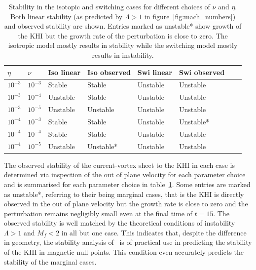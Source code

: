 \begin{table}[t]
\centering
\begin{tabular}{llllllll}
$\eta$    & $\nu$     & Iso linear & Iso observed & Swi linear & Swi observed  \\
\midrule
$10^{-3}$ & $10^{-3}$ & Stable     & Stable       & Unstable   & Unstable         & \\
$10^{-3}$ & $10^{-4}$ & Unstable   & Stable       & Unstable   & Unstable         & \\
$10^{-3}$ & $10^{-5}$ & Unstable   & Unstable     & Unstable   & Unstable         & \\
$10^{-4}$ & $10^{-3}$ & Stable     & Stable       & Unstable   & Unstable*         & \\
$10^{-4}$ & $10^{-4}$ & Stable     & Stable       & Unstable   & Unstable         & \\
$10^{-4}$ & $10^{-5}$ & Unstable   & Unstable*     & Unstable   & Unstable         &
\end{tabular}
\caption{Stability in the isotopic and switching cases for different choices of $\nu$ and $\eta$. Both linear stability (as predicted by $\Lambda > 1$ in figure~\ref{fig:mach_numbers}) and observed stability are shown. Entries marked as unstable* show growth of the KHI but the growth rate of the perturbation is close to zero. The isotropic model mostly results in stability while the switching model mostly results in instability.}
\label{tab:stability}
\end{table}

The observed stability of the current-vortex sheet to the KHI in each case is determined via inspection of the out of plane velocity for each parameter choice and is summarised for each parameter choice in table~\ref{tab:stability}. Some entries are marked as unstable*, referring to their being marginal cases, that is the KHI is directly observed in the out of plane velocity but the growth rate is close to zero and the perturbation remains negligibly small even at the final time of $t=15$. The observed stability is well matched by the theoretical conditions of instability $\Lambda > 1$ and $M_f < 2$ in all but one case. This indicates that, despite the difference in geometry, the stability analysis of~\cite{einaudiResistiveInstabilitiesFlowing1986} is of practical use in predicting the stability of the KHI in magnetic null points. This condition even accurately predicts the stability of the marginal cases. 

